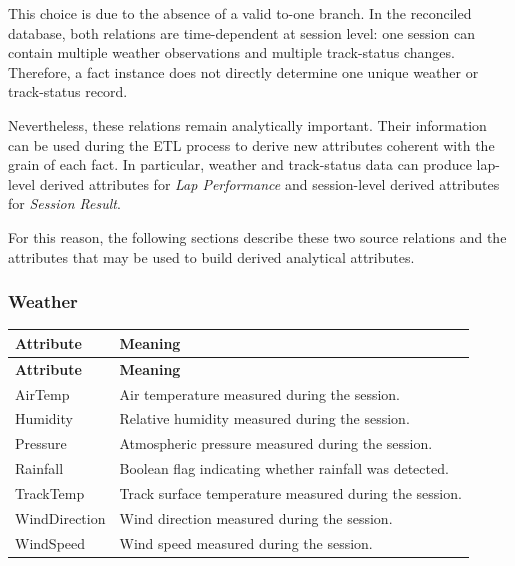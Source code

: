 \documentclass[a4paper,11pt]{article}
\begin{document}
	This choice is due to the absence of a valid to-one branch. In the reconciled database,
	both relations are time-dependent at session level: one session can contain multiple
	weather observations and multiple track-status changes. Therefore, a fact instance does
	not directly determine one unique weather or track-status record.
	
	Nevertheless, these relations remain analytically important. Their information can be
	used during the ETL process to derive new attributes coherent with the grain of each
	fact. In particular, weather and track-status data can produce lap-level derived attributes
	for \textit{Lap Performance} and session-level derived attributes for
	\textit{Session Result}.
	
	For this reason, the following sections describe these two source relations and the
	attributes that may be used to build derived analytical attributes.
		
	
	\subsubsection{Weather }
	
	
	\begin{longtable}{|p{4cm}|p{10.8cm}|}
		\hline
		\textbf{Attribute} & \textbf{Meaning} \\
		\hline
		\endfirsthead
		
		\hline
		\textbf{Attribute} & \textbf{Meaning} \\
		\hline
		\endhead
		
		AirTemp & Air temperature measured during the session. \\ \hline
		
		Humidity & Relative humidity measured during the session. \\ \hline
		
		Pressure & Atmospheric pressure measured during the session. \\ \hline
		
		Rainfall & Boolean flag indicating whether rainfall was detected. \\ \hline
		
		TrackTemp & Track surface temperature measured during the session. \\ \hline
		
		WindDirection & Wind direction measured during the session. \\ \hline
		
		WindSpeed & Wind speed measured during the session. \\ \hline
	\end{longtable}
	
\end{document}
